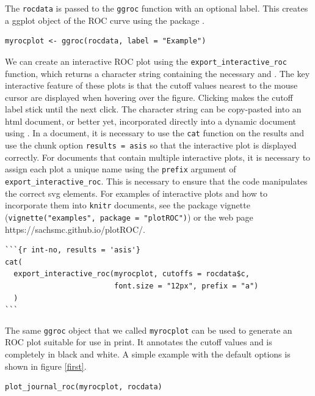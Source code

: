\documentclass[article]{jss}
\begin{document}
The \texttt{rocdata} is passed to the \texttt{ggroc} function with an
optional label. This creates a ggplot object of the ROC curve using the
 package \citep{ggplot2}.

\begin{verbatim}
myrocplot <- ggroc(rocdata, label = "Example")
\end{verbatim}

We can create an interactive ROC plot using the
\texttt{export\_interactive\_roc} function, which returns a character
string containing the necessary  and
. The key interactive feature of these plots is
that the cutoff values nearest to the mouse cursor are displayed when
hovering over the figure. Clicking makes the cutoff label stick until
the next click. The character string can be copy-pasted into an html
document, or better yet, incorporated directly into a dynamic document
using  \citep{knitr}. In a  document, it is
necessary to use the \texttt{cat} function on the results and use the
chunk option \texttt{results = \textquotesingle{}asis\textquotesingle{}}
so that the interactive plot is displayed correctly. For documents that
contain multiple interactive plots, it is necessary to assign each plot
a unique name using the \texttt{prefix} argument of
\texttt{export\_interactive\_roc}. This is necessary to ensure that the
 code manipulates the correct svg elements. For
examples of interactive plots and how to incorporate them into
\texttt{knitr} documents, see the package vignette
(\texttt{vignette("examples", package = "plotROC")}) or the web page
https://sachsmc.github.io/plotROC/.

\begin{verbatim}
```{r int-no, results = 'asis'}
cat(
  export_interactive_roc(myrocplot, cutoffs = rocdata$c, 
                         font.size = "12px", prefix = "a")
  )
```
\end{verbatim}

The same \texttt{ggroc} object that we called \texttt{myrocplot} can be
used to generate an ROC plot suitable for use in print. It annotates the
cutoff values and is completely in black and white. A simple example
with the default options is shown in figure \ref{first}.

\begin{verbatim}
plot_journal_roc(myrocplot, rocdata)
\end{verbatim}
\end{document}
